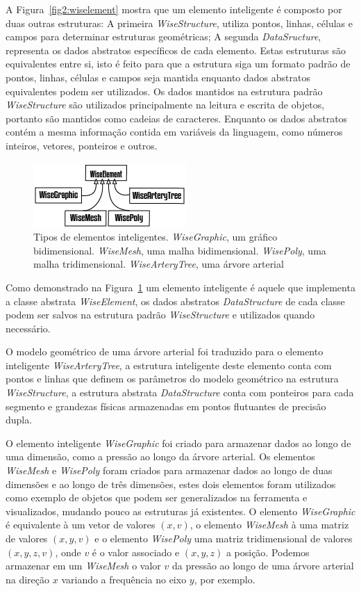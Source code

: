 \documentclass[
        english,			
        brazil			        %
        ,<...>]{abntbibufjf}
\begin{document}
A Figura~\ref{fig2:wiselement} mostra que um elemento inteligente é composto por duas outras estruturas: A primeira \textit{WiseStructure}, utiliza pontos, linhas, células e campos para determinar estruturas geométricas; A segunda \textit{DataSructure}, representa os dados abstratos específicos de cada elemento. Estas estruturas são equivalentes entre si, isto é feito para que a estrutura siga um formato padrão de pontos, linhas, células e campos seja mantida enquanto dados abstratos equivalentes podem ser utilizados. Os dados mantidos na estrutura padrão \textit{WiseStructure} são utilizados principalmente na leitura e escrita de objetos, portanto são mantidos como cadeias de caracteres. Enquanto os dados abstratos contém a mesma informação contida em variáveis da linguagem, como números inteiros, vetores, ponteiros e outros.

\begin{figure}[!htbp]
	\centering
	\includegraphics[scale=1]{Figures/WiseElements.png}
	\caption{Tipos de elementos inteligentes. \textit{WiseGraphic}, um gráfico bidimensional. \textit{WiseMesh}, uma malha bidimensional. \textit{WisePoly}, uma malha tridimensional. \textit{WiseArteryTree}, uma árvore arterial}
	\label{fig2:wiselements}
\end{figure}

 Como demonstrado na Figura~\ref{fig2:wiselements} um elemento inteligente é aquele que implementa a classe abstrata \textit{WiseElement}, os dados abstratos \textit{DataStructure} de cada classe podem ser salvos na estrutura padrão \textit{WiseStructure} e utilizados quando necessário. 
 
 O modelo geométrico de uma árvore arterial foi traduzido para o elemento inteligente \textit{WiseArteryTree}, a estrutura inteligente deste elemento conta com pontos e linhas que definem os parâmetros do modelo geométrico na estrutura \textit{WiseStructure}, a estrutura abstrata \textit{DataStructure} conta com ponteiros para cada segmento e grandezas físicas armazenadas em pontos flutuantes de precisão dupla.
 
O elemento inteligente \textit{WiseGraphic} foi criado para armazenar dados ao longo de uma dimensão, como a pressão ao longo da árvore arterial. Os elementos \textit{WiseMesh} e \textit{WisePoly} foram criados para armazenar dados ao longo de duas dimensões e ao longo de três dimensões, estes dois elementos foram utilizados como exemplo de objetos que podem ser generalizados na ferramenta e visualizados, mudando pouco as estruturas já existentes. O elemento \textit{WiseGraphic} é equivalente à um vetor de valores $(x,v)$, o elemento \textit{WiseMesh} à uma matriz de valores $(x,y,v)$ e o elemento \textit{WisePoly} uma matriz tridimensional de valores $(x,y,z,v)$, onde $v$ é o valor associado e $(x,y,z)$ a posição. Podemos armazenar em um \textit{WiseMesh} o valor $v$ da pressão ao longo de uma árvore arterial na direção $x$ variando a frequência no eixo $y$, por exemplo.
 
\end{document}

